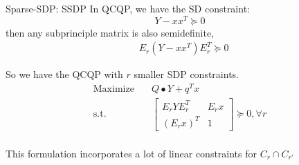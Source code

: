\begin{frame}{Sparse-SDP: SSDP}
  In QCQP, we have the SD constraint:
  \[Y - xx^T \succeq 0\]
  then any subprinciple matrix is also semidefinite,
  \begin{equation}
    \begin{aligned}
       & E_r (Y - x x^T) E_r^T \succeq 0
    \end{aligned}
  \end{equation}

  So we have the QCQP with \(r\) smaller SDP constraints.
  \begin{equation}\label{eq:sdp.blocks}
    \begin{aligned}
      \mathrm{Maximize}\quad & Q \bullet Y + q^Tx                               \\
      \mathrm{s.t.} \quad    & \begin{bmatrix}E_r Y E_r^T & E_rx \\ (E_rx)^T & 1\end{bmatrix}   \succeq 0, \forall r \\
    \end{aligned}
  \end{equation}

  This formulation incorporates a lot of linear constraints for \(C_r \cap C_{r'}\)
\end{frame}
